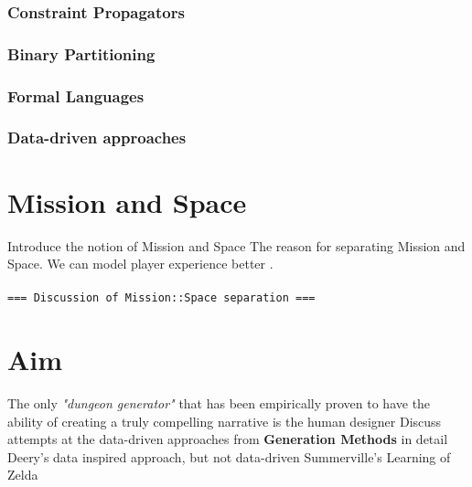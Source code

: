 \documentclass{UoYCSproject}
\begin{document}
\subsubsection{Constraint Propagators}

\subsubsection{Binary Partitioning}

\subsubsection{Formal Languages}

\subsubsection{Data-driven approaches}

\section{Mission and Space}
\begin{outline}
  \1 Introduce the notion of Mission and Space
  \1 The reason for separating Mission and Space. We can model player experience better \parencite{DormansMS,SummervilleLearningOfZelda}.
\end{outline}

\paragraph{}
\texttt{=== Discussion of Mission::Space separation ===}

\section{Aim}
\begin{outline}
  \1 The only \textit{"dungeon generator"} that has been empirically proven to have the ability of creating a truly compelling narrative is the human designer
  \1 Discuss attempts at the data-driven approaches from \textbf{Generation Methods} in detail
    \2 Deery's data inspired approach, but not data-driven
    \2 Summerville's Learning of Zelda
\end{outline}
\end{document}
